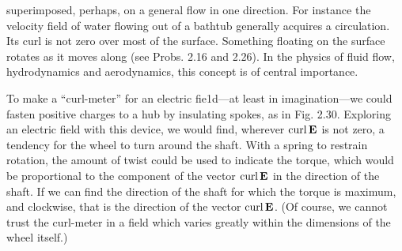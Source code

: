 superimposed, perhaps, on a general flow in one direction. For
instance the velocity field of water flowing out of a bathtub generally
acquires a circulation. Its curl is not zero over most of the surface.
Something floating on the surface rotates as it moves along (see
Probs. 2.16 and 2.26). In the physics of fluid flow, hydrodynamics
and aerodynamics, this concept is of central importance.

To make a ``curl-meter'' for an electric fie1d---at least in 
imagination---we could fasten positive charges to a hub by insulating spokes,
as in Fig. 2.30. Exploring an electric field with this device, we would
find, wherever $\operatorname{curl}\mathbf{E}$ is not zero, a tendency for the wheel to turn
around the shaft. With a spring to restrain rotation, the amount of
twist could be used to indicate the torque, which would be proportional
to the component of the vector $\operatorname{curl}\mathbf{E}$ in the direction of the
shaft. If we can find the direction of the shaft for which the torque
is maximum, and clockwise, that is the direction of the vector $\operatorname{curl}\mathbf{E}$.
(Of course, we cannot trust the curl-meter in a field which varies
greatly within the dimensions of the wheel itself.)

